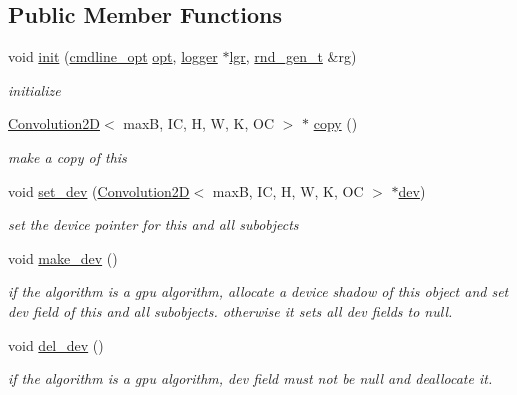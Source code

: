 \subsection*{Public Member Functions}
\begin{DoxyCompactItemize}
\item 
void \hyperlink{structConvolution2D_aa3c6a51a0b4278dacf8dff4f80e86943}{init} (\hyperlink{structcmdline__opt}{cmdline\+\_\+opt} \hyperlink{structConvolution2D_ad873766a934a3589b2feec7933dc11f2}{opt}, \hyperlink{structlogger}{logger} $\ast$\hyperlink{structConvolution2D_a1c0363cbb527e0dcdb032a2b6b5ea9e6}{lgr}, \hyperlink{structrnd__gen__t}{rnd\+\_\+gen\+\_\+t} \&rg)
\begin{DoxyCompactList}\small\item\em initialize \end{DoxyCompactList}\item 
\hyperlink{structConvolution2D}{Convolution2D}$<$ maxB, IC, H, W, K, OC $>$ $\ast$ \hyperlink{structConvolution2D_aec12842fd665f7d7a0d6d68db68f4fed}{copy} ()
\begin{DoxyCompactList}\small\item\em make a copy of this \end{DoxyCompactList}\item 
void \hyperlink{structConvolution2D_a4e0dca3719249dbceb4afe64f8844f7f}{set\+\_\+dev} (\hyperlink{structConvolution2D}{Convolution2D}$<$ maxB, IC, H, W, K, OC $>$ $\ast$\hyperlink{structConvolution2D_a3b9891c27e266092619413a16518a9e9}{dev})
\begin{DoxyCompactList}\small\item\em set the device pointer for this and all subobjects \end{DoxyCompactList}\item 
void \hyperlink{structConvolution2D_a9c6908bf3797c1b38dec8c33beb8df49}{make\+\_\+dev} ()
\begin{DoxyCompactList}\small\item\em if the algorithm is a gpu algorithm, allocate a device shadow of this object and set dev field of this and all subobjects. otherwise it sets all dev fields to null. \end{DoxyCompactList}\item 
void \hyperlink{structConvolution2D_a3f508b68dc981593f5a2980e6b88a247}{del\+\_\+dev} ()
\begin{DoxyCompactList}\small\item\em if the algorithm is a gpu algorithm, dev field must not be null and deallocate it. \end{DoxyCompactList}\item 

\end{DoxyCompactItemize}
